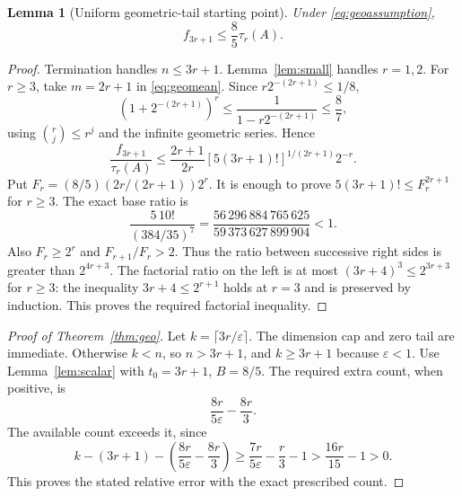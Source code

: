 \documentclass[11pt]{article}
\newtheorem{lemma}[theorem]{Lemma}
\theoremstyle{remark}\newtheorem{remark}[theorem]{Remark}
\newcommand{\eps}{\varepsilon}
\begin{document}
\begin{lemma}[Uniform geometric-tail starting point]\label{lem:geowarm}
Under \eqref{eq:geoassumption},
\begin{equation}
 f_{3r+1}\le\frac85\tau_r(A). \label{eq:geowarm}
\end{equation}
\end{lemma}
\begin{proof}
Termination handles $n\le3r+1$. Lemma~\ref{lem:small} handles $r=1,2$. For $r\ge3$, take $m=2r+1$ in \eqref{eq:geomean}. Since $r2^{-(2r+1)}\le1/8$,
\[
 (1+2^{-(2r+1)})^r\le\frac1{1-r2^{-(2r+1)}}\le\frac87,
\]
using ${r\choose j}\le r^j$ and the infinite geometric series. Hence
\[
 \frac{f_{3r+1}}{\tau_r(A)}
 \le\frac{2r+1}{2r}[5(3r+1)!]^{1/(2r+1)}2^{-r}.
\]
Put $F_r=(8/5)(2r/(2r+1))2^r$. It is enough to prove
$5(3r+1)!\le F_r^{2r+1}$ for $r\ge3$. The exact base ratio is
\[
 \frac{5\,10!}{(384/35)^7}
 =\frac{56\,296\,884\,765\,625}{59\,373\,627\,899\,904}<1.
\]
Also $F_r\ge2^r$ and $F_{r+1}/F_r>2$. Thus the ratio between successive right sides is greater than $2^{4r+3}$. The factorial ratio on the left is at most $(3r+4)^3\le2^{3r+3}$ for $r\ge3$: the inequality $3r+4\le2^{r+1}$ holds at $r=3$ and is preserved by induction. This proves the required factorial inequality.
\end{proof}

\begin{proof}[Proof of Theorem~\ref{thm:geo}]
Let $k=\lceil3r/\eps\rceil$. The dimension cap and zero tail are immediate. Otherwise $k<n$, so $n>3r+1$, and $k\ge3r+1$ because $\eps<1$. Use Lemma~\ref{lem:scalar} with $t_0=3r+1$, $B=8/5$. The required extra count, when positive, is
\[
 \frac{8r}{5\eps}-\frac{8r}{3}.
\]
The available count exceeds it, since
\[
 k-(3r+1)-\left(\frac{8r}{5\eps}-\frac{8r}{3}\right)
 \ge\frac{7r}{5\eps}-\frac r3-1
 >\frac{16r}{15}-1>0.
\]
This proves the stated relative error with the exact prescribed count.
\end{proof}
\end{document}
